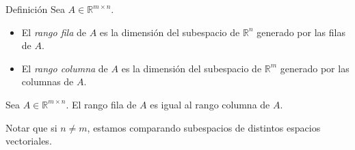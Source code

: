 \documentclass[handout]{beamer} %
\newcommand{\R}{\mathbb R}
\newcommand{\K}{\mathbb K}
\begin{document}

\begin{frame}


\begin{exampleblock}{Definición}
Sea $A\in\R^{m\times n}$.  \pause
\begin{itemize}
 \item El \textit{rango fila} de $A$ es la dimensión del subespacio de $\R^n$ generado por las filas de $A$.\pause
 \item El \textit{rango columna} de $A$ es la dimensión del subespacio de $\R^m$ generado por las columnas de $A$.
\end{itemize}
\end{exampleblock}\pause



\begin{teorema}
Sea $A\in\R^{m\times n}$. El rango fila de $A$ es igual al rango columna de $A$.
\end{teorema}\pause

Notar que si $n\neq m$, estamos comparando subespacios de distintos espacios vectoriales.

\

\end{frame}
\end{document}
